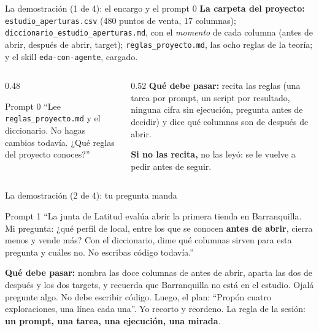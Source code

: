\documentclass{beamer}
\begin{document}
\begin{frame}{La demostración (1 de 4): el encargo y el prompt 0}
\small
\textbf{La carpeta del proyecto:} \texttt{estudio\_aperturas.csv} (480 puntos de venta, 17 columnas); \texttt{diccionario\_estudio\_aperturas.md}, con el \emph{momento} de cada columna (antes de abrir, después de abrir, target); \texttt{reglas\_proyecto.md}, las ocho reglas de la teoría; y el skill \texttt{eda-con-agente}, cargado.
\medskip
\begin{columns}[T]
\begin{column}{0.48\textwidth}
\begin{exampleblock}{Prompt 0}
``Lee \texttt{reglas\_proyecto.md} y el diccionario. No hagas cambios todavía. ¿Qué reglas del proyecto conoces?''
\end{exampleblock}
\end{column}
\begin{column}{0.52\textwidth}
\textbf{Qué debe pasar:} recita las reglas (una tarea por prompt, un script por resultado, ninguna cifra sin ejecución, pregunta antes de decidir) y dice qué columnas son de después de abrir.

\medskip
\textbf{Si no las recita,} no las leyó: se le vuelve a pedir antes de seguir.
\end{column}
\end{columns}
\end{frame}

\begin{frame}{La demostración (2 de 4): tu pregunta manda}
\begin{exampleblock}{Prompt 1}
\small ``La junta de Latitud evalúa abrir la primera tienda en Barranquilla. Mi pregunta: ¿qué perfil de local, entre los que se conocen \textbf{antes de abrir}, cierra menos y vende más? Con el diccionario, dime qué columnas sirven para esta pregunta y cuáles no. No escribas código todavía.''
\end{exampleblock}
\small
\textbf{Qué debe pasar:} nombra las doce columnas de antes de abrir, aparta las dos de después y los dos targets, y recuerda que Barranquilla no está en el estudio. Ojalá pregunte algo. No debe escribir código.
\smallskip
{}
\medskip
Luego, el plan: ``Propón cuatro exploraciones, una línea cada una''. Yo recorto y reordeno. La regla de la sesión: \textbf{un prompt, una tarea, una ejecución, una mirada}.
\end{frame}
\end{document}

